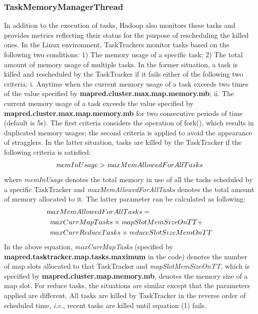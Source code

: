 \subsubsection{TaskMemoryManagerThread}
In addition to the execution of tasks, Hadoop also monitors these tasks and provides metrics reflecting their status for the purpose of rescheduling the killed ones.
In the Linux environment, TaskTrackers monitor tasks based on the following two conditions:  1) The memory usage of a specific task; 2) The total amount of memory usage of multiple tasks.
In the former situation, a task is killed and rescheduled by the TaskTracker if it fails either of the following two criteria:
i. Anytime when the current memory usage of a task exceeds two times of the value specified by {\bf mapred.cluster.max.map.memory.mb};
ii. The current memory usage of a task exceeds the value specified by {\bf mapred.cluster.max.map.memory.mb} for two consecutive periods of time (default is 5s). 
The first criteria considers the operation of fork(), which results in duplicated memory usages; the second criteria is applied to avoid the appearance of stragglers.
In the latter situation, tasks are killed by the TaskTracker if the following criteria is satisfied:
\begin{equation}
{\emph memInUsage} > {\emph maxMemAllowedForAllTasks} 
\end{equation}
where \emph {memInUsage} denotes the total memory in use of all the tasks scheduled by a specific TaskTracker and \emph {maxMemAllowedForAllTasks} denotes the total amount of memory allocated to it. The latter parameter can be calculated as following:
\begin{equation*}
\begin{aligned}
&{\emph maxMemAllowedForAllTasks} = \\
& \hspace {5pt} {\emph maxCurrMapTasks} \times {\emph mapSlotMemSizeOnTT} + \\
& \hspace {5pt} {\emph maxCurrReduceTasks} \times {\emph reduceSlotSizeMemOnTT}
\end{aligned}
\end{equation*}
In the above equation, \emph {maxCurrMapTasks} (specified by {\bf mapred.tasktracker.map.tasks.maximum} in the code) denotes the number of map slots allocated to that TaskTracker and \emph {mapSlotMemSizeOnTT}, which is specified by {\bf mapred.cluster.map.memory.mb}, denotes the memory size of a map slot. 
For reduce tasks, the situations are similar except that the parameters applied are different.
All tasks are killed by TaskTracker in the reverse order of scheduled time, \emph{i.e.}, recent tasks are killed until equation (1) fails. 
